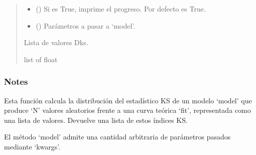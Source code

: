 \documentclass[letterpaper,10pt,english]{sphinxmanual}
\begin{document}
\begin{fulllineitems}
\begin{quote}
\begin{description}
\begin{itemize}
\item {} 
\sphinxAtStartPar
{} (\sphinxstyleliteralemphasis{\sphinxupquote{, }}) \textendash{} Si es True, imprime el progreso. Por defecto es True.

\item {} 
\sphinxAtStartPar
{} () \textendash{} Parámetros a pasar a ‘model’.

\end{itemize}

\sphinxAtStartPar
Lista de valores Dks.

\sphinxAtStartPar
list of float

\end{description}\end{quote}
\subsubsection*{Notes}

\sphinxAtStartPar
Esta función calcula la distribución del estadístico KS de un modelo ‘model’ que produce ‘N’ valores aleatorios frente a
una curva teórica ‘fit’, representada como una lista de valores. Devuelve una lista de estos índices KS.

\sphinxAtStartPar
El método ‘model’ admite una cantidad arbitraria de parámetros pasados mediante ‘kwargs’.

\end{fulllineitems}

\end{document}
